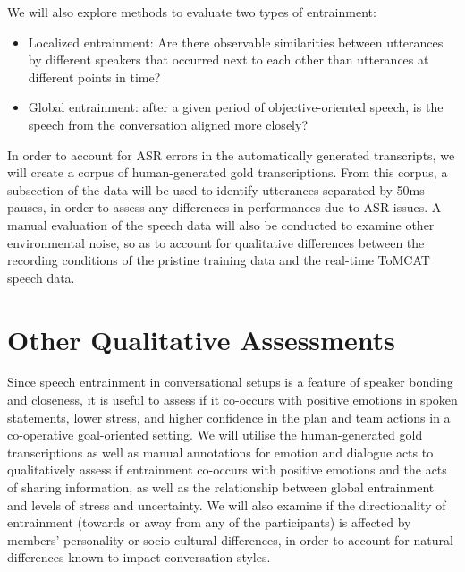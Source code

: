    We will also explore methods to evaluate two types of entrainment:

    \begin{itemize}
        \item Localized entrainment: Are there observable similarities between utterances by different speakers that occurred next to each other than utterances at different points in time?
        \item Global entrainment: after a given period of objective-oriented speech, is the speech from the conversation aligned more closely? 
    \end{itemize}

    In order to account for ASR errors in the automatically generated transcripts, we will create a corpus of human-generated gold transcriptions. From this corpus, a subsection of the data will be used to identify utterances separated by 50ms pauses, in order to assess any differences in performances due to ASR issues. A manual evaluation of the speech data will also be conducted to examine other environmental noise, so as to account for qualitative differences between the recording conditions of the pristine training data and the real-time ToMCAT speech data. 

   \section{Other Qualitative Assessments}

   Since speech entrainment in conversational setups is a feature of speaker bonding and closeness, it is useful to assess if it co-occurs with positive emotions in spoken statements, lower stress, and higher confidence in the plan and team actions in a co-operative goal-oriented setting. We will utilise the human-generated gold transcriptions as well as manual annotations for emotion and dialogue acts to qualitatively assess if entrainment co-occurs with positive emotions and the acts of sharing information, as well as the relationship between global entrainment and levels of stress and uncertainty. We will also examine if the directionality of entrainment (towards or away from any of the participants) is affected by members' personality or socio-cultural differences, in order to account for natural differences known to impact conversation styles.

